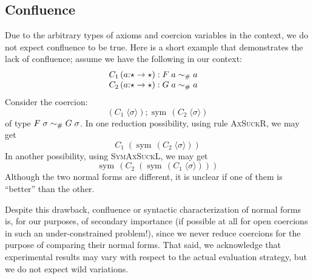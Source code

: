 \documentclass[a4paper,UKenglish]{lipics}
\makeatletter
\newcommand{\dv}[1]{{\bf DV:}\begin{color}{red} #1 \end{color}}
\def\rulename#1{\textsc{#1}}
\newcommand{\psim}{\mathrel{\sim_{\tiny \#}}}
\def\rulename#1{\textsc{#1}}
\newcommand{\sym}[1]{\mathop{sym}\, #1}
\newcommand{\nth}[2]{\mathop{nth} #1\;#2}
\newcommand{\inst}[2]{#1@#2}
\newcommand{\refl}[1]{\langle#1\rangle}  %
\makeatother
\begin{document}
\subsection{Confluence}

Due to the arbitrary types of axioms and coercion variables in the context, we do not expect 
confluence to be true. Here is a short example that demonstrates the lack of 
confluence; assume we have the following in our context:
\[\begin{array}{lcl} 
C_1 \, (a{:}\star \to \star) : F\;a \psim a & \\ 
C_2 \, (a{:}\star \to \star) : G\;a \psim a & 
\end{array}\]
Consider the coercion:
\[      (C_1\;\refl{\sigma});\sym{(C_2\;\refl{\sigma})}  \] 
of type $F\;\sigma \psim G\;\sigma$. In one reduction possibility, using 
rule \rulename{AxSuckR}, we may get 
\[ C_1\;(\sym{(C_2\;\refl{\sigma})}) \] 
In another possibility, using \rulename{SymAxSuckL}, we 
may get 
\[ \sym{(C_2\;(\sym{(C_1\;\refl{\sigma})}))} \]
Although the two normal forms are different, it is unclear if one of them is ``better'' than the other. 

Despite this drawback, confluence or syntactic characterization of normal forms is, for our purposes, 
of secondary importance (if possible at all for open coercions in such an under-constrained problem!), 
since we never reduce coercions for the purpose of comparing their normal forms. That said, we acknowledge 
that experimental results may vary with respect to the actual evaluation strategy, but we do not expect 
wild variations.













\end{document}
